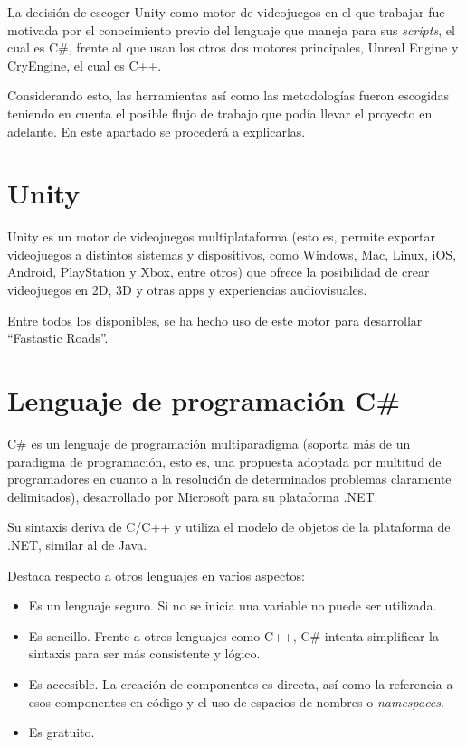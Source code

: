  \label{cap:tecnicas}
La decisión de escoger Unity como motor de videojuegos en el que trabajar fue motivada por el conocimiento previo del lenguaje que maneja para sus \textit{scripts}, el cual es C\#, frente al que usan los otros dos motores principales, Unreal Engine y CryEngine, el cual es C++.

Considerando esto, las herramientas así como las metodologías fueron escogidas teniendo en cuenta el posible flujo de trabajo que podía llevar el proyecto en adelante. En este apartado se procederá a explicarlas.

\section{Unity}

Unity es un motor de videojuegos multiplataforma (esto es, permite exportar videojuegos a distintos sistemas y dispositivos, como Windows, Mac, Linux, iOS, Android, PlayStation y Xbox, entre otros) que ofrece la posibilidad de crear videojuegos en 2D, 3D y otras apps y experiencias audiovisuales.

Entre todos los disponibles, se ha hecho uso de este motor para desarrollar ``Fastastic Roads''.

\section{Lenguaje de programación C\#}

C\# es un lenguaje de programación multiparadigma (soporta más de un paradigma de programación, esto es, una propuesta adoptada por multitud de programadores en cuanto a la resolución de determinados problemas claramente delimitados), desarrollado por Microsoft para su plataforma .NET.

Su sintaxis deriva de C/C++ y utiliza el modelo de objetos de la plataforma de .NET, similar al de Java.

Destaca respecto a otros lenguajes en varios aspectos:
\begin{itemize}
\tightlist
    \item Es un lenguaje seguro. Si no se inicia una variable no puede ser utilizada.
    \item Es sencillo. Frente a otros lenguajes como C++, C\# intenta simplificar la sintaxis para ser más consistente y lógico.
    \item Es accesible. La creación de componentes es directa, así como la referencia a esos componentes en código y el uso de espacios de nombres o \textit{namespaces}.
    \item Es gratuito.
\end{itemize}

